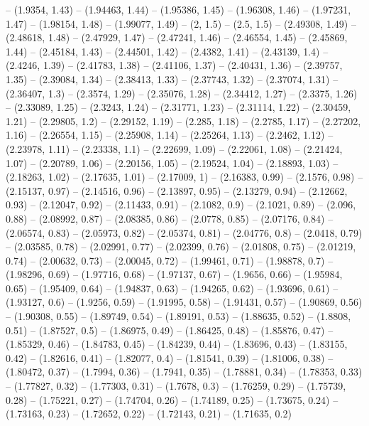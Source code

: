-- (1.9354, 1.43)
-- (1.94463, 1.44)
-- (1.95386, 1.45)
-- (1.96308, 1.46)
-- (1.97231, 1.47)
-- (1.98154, 1.48)
-- (1.99077, 1.49)
-- (2, 1.5)
-- (2.5, 1.5)
-- (2.49308, 1.49)
-- (2.48618, 1.48)
-- (2.47929, 1.47)
-- (2.47241, 1.46)
-- (2.46554, 1.45)
-- (2.45869, 1.44)
-- (2.45184, 1.43)
-- (2.44501, 1.42)
-- (2.4382, 1.41)
-- (2.43139, 1.4)
-- (2.4246, 1.39)
-- (2.41783, 1.38)
-- (2.41106, 1.37)
-- (2.40431, 1.36)
-- (2.39757, 1.35)
-- (2.39084, 1.34)
-- (2.38413, 1.33)
-- (2.37743, 1.32)
-- (2.37074, 1.31)
-- (2.36407, 1.3)
-- (2.3574, 1.29)
-- (2.35076, 1.28)
-- (2.34412, 1.27)
-- (2.3375, 1.26)
-- (2.33089, 1.25)
-- (2.3243, 1.24)
-- (2.31771, 1.23)
-- (2.31114, 1.22)
-- (2.30459, 1.21)
-- (2.29805, 1.2)
-- (2.29152, 1.19)
-- (2.285, 1.18)
-- (2.2785, 1.17)
-- (2.27202, 1.16)
-- (2.26554, 1.15)
-- (2.25908, 1.14)
-- (2.25264, 1.13)
-- (2.2462, 1.12)
-- (2.23978, 1.11)
-- (2.23338, 1.1)
-- (2.22699, 1.09)
-- (2.22061, 1.08)
-- (2.21424, 1.07)
-- (2.20789, 1.06)
-- (2.20156, 1.05)
-- (2.19524, 1.04)
-- (2.18893, 1.03)
-- (2.18263, 1.02)
-- (2.17635, 1.01)
-- (2.17009, 1)
-- (2.16383, 0.99)
-- (2.1576, 0.98)
-- (2.15137, 0.97)
-- (2.14516, 0.96)
-- (2.13897, 0.95)
-- (2.13279, 0.94)
-- (2.12662, 0.93)
-- (2.12047, 0.92)
-- (2.11433, 0.91)
-- (2.1082, 0.9)
-- (2.1021, 0.89)
-- (2.096, 0.88)
-- (2.08992, 0.87)
-- (2.08385, 0.86)
-- (2.0778, 0.85)
-- (2.07176, 0.84)
-- (2.06574, 0.83)
-- (2.05973, 0.82)
-- (2.05374, 0.81)
-- (2.04776, 0.8)
-- (2.0418, 0.79)
-- (2.03585, 0.78)
-- (2.02991, 0.77)
-- (2.02399, 0.76)
-- (2.01808, 0.75)
-- (2.01219, 0.74)
-- (2.00632, 0.73)
-- (2.00045, 0.72)
-- (1.99461, 0.71)
-- (1.98878, 0.7)
-- (1.98296, 0.69)
-- (1.97716, 0.68)
-- (1.97137, 0.67)
-- (1.9656, 0.66)
-- (1.95984, 0.65)
-- (1.95409, 0.64)
-- (1.94837, 0.63)
-- (1.94265, 0.62)
-- (1.93696, 0.61)
-- (1.93127, 0.6)
-- (1.9256, 0.59)
-- (1.91995, 0.58)
-- (1.91431, 0.57)
-- (1.90869, 0.56)
-- (1.90308, 0.55)
-- (1.89749, 0.54)
-- (1.89191, 0.53)
-- (1.88635, 0.52)
-- (1.8808, 0.51)
-- (1.87527, 0.5)
-- (1.86975, 0.49)
-- (1.86425, 0.48)
-- (1.85876, 0.47)
-- (1.85329, 0.46)
-- (1.84783, 0.45)
-- (1.84239, 0.44)
-- (1.83696, 0.43)
-- (1.83155, 0.42)
-- (1.82616, 0.41)
-- (1.82077, 0.4)
-- (1.81541, 0.39)
-- (1.81006, 0.38)
-- (1.80472, 0.37)
-- (1.7994, 0.36)
-- (1.7941, 0.35)
-- (1.78881, 0.34)
-- (1.78353, 0.33)
-- (1.77827, 0.32)
-- (1.77303, 0.31)
-- (1.7678, 0.3)
-- (1.76259, 0.29)
-- (1.75739, 0.28)
-- (1.75221, 0.27)
-- (1.74704, 0.26)
-- (1.74189, 0.25)
-- (1.73675, 0.24)
-- (1.73163, 0.23)
-- (1.72652, 0.22)
-- (1.72143, 0.21)
-- (1.71635, 0.2)
